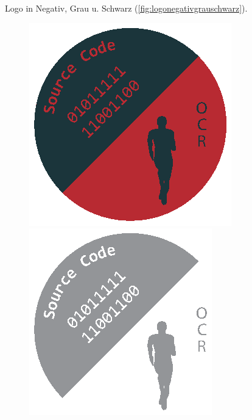 Logo in Negativ, Grau u. Schwarz (\autoref{fig:logonegativgrauschwarz}).
\begin{figure}[!h]%
	\centering
	\begin{minipage}[b]{0.40\textwidth}
		\includegraphics[width=\textwidth]{content/beispiele/images/Logo-negativ.eps}
	\end{minipage}
	\hfill
	\begin{minipage}[b]{0.30\textwidth}
		\includegraphics[width=\textwidth]{content/beispiele/images/Logo-Grau.eps}

\end{minipage}
\end{figure}
